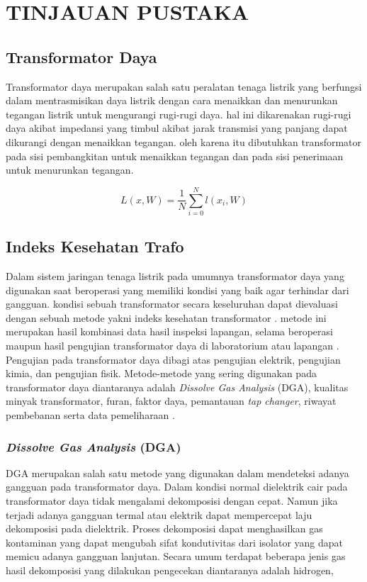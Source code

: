 \chapter{TINJAUAN PUSTAKA}
\label{BAB2:tinjauan}
\section{Transformator Daya}

Transformator daya merupakan salah satu peralatan tenaga listrik yang berfungsi dalam mentrasmisikan daya listrik dengan cara menaikkan dan menurunkan tegangan listrik untuk mengurangi rugi-rugi daya. hal ini dikarenakan rugi-rugi daya akibat impedansi yang timbul akibat jarak transmisi yang panjang dapat dikurangi dengan menaikkan tegangan. oleh karena itu dibutuhkan transformator pada sisi pembangkitan untuk menaikkan tegangan dan pada sisi penerimaan untuk menurunkan tegangan.



\begin{equation}
  L(x,W)= \frac{1}{N}\sum\limits_{i=0}^{N} l(x_i,W)   
  \label{func:loss}
\end{equation}

\section{Indeks Kesehatan Trafo}
Dalam sistem jaringan tenaga listrik pada umumnya transformator daya yang digunakan saat beroperasi yang memiliki kondisi yang baik agar terhindar dari gangguan. kondisi sebuah transformator secara keseluruhan dapat dievaluasi dengan sebuah metode yakni indeks kesehatan transformator \cite{nurcahyanto2019analysis}. metode ini merupakan hasil kombinasi data hasil inspeksi lapangan, selama beroperasi maupun hasil pengujian transformator daya di laboratorium atau lapangan \cite{ortiz2016health}. Pengujian pada transformator daya dibagi atas pengujian elektrik, pengujian kimia, dan pengujian fisik. Metode-metode yang sering digunakan pada transformator daya diantaranya adalah \textit{Dissolve Gas Analysis} (DGA), kualitas minyak transformator, furan, faktor daya, pemantauan \textit{tap changer}, riwayat pembebanan serta data pemeliharaan \cite{jahromi2009approach}.

\subsection{\textit{Dissolve Gas Analysis} (DGA)}
DGA merupakan salah satu metode yang digunakan dalam mendeteksi adanya gangguan pada transformator daya. Dalam kondisi normal dielektrik cair pada transformator daya tidak mengalami dekomposisi dengan cepat. Namun jika terjadi adanya gangguan termal atau elektrik dapat mempercepat laju dekomposisi pada dielektrik. Proses dekomposisi dapat menghasilkan gas kontaminan yang dapat mengubah sifat kondutivitas dari isolator yang dapat memicu adanya gangguan lanjutan. Secara umum terdapat beberapa jenis gas hasil dekomposisi yang dilakukan pengecekan diantaranya adalah hidrogen, 

